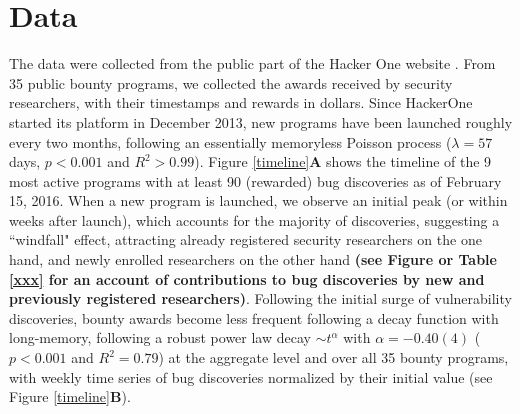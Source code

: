 \section{Data}
\label{sec:data}
The data were collected from the public part of the Hacker One website \cite{hackerOne}. From 35 public bounty programs, we collected the awards received by security researchers, with their timestamps and rewards in dollars. Since HackerOne started its platform in December 2013, new programs have been launched roughly every two months, following an essentially memoryless Poisson process ($\lambda = 57$ days, $p < 0.001$ and $R^2 > 0.99$). Figure \ref{timeline}{\bf A} shows the timeline of the 9 most active programs with at least 90 (rewarded) bug discoveries as of February 15, 2016. When a new program is launched, we observe an initial peak (or within weeks after launch), which accounts for the majority of discoveries, suggesting a ``windfall" effect, attracting already registered security researchers on the one hand, and newly enrolled researchers on the other hand {\bf (see Figure or Table \ref{xxx} for an account of contributions to bug discoveries by new and previously registered researchers)}. Following the initial surge of vulnerability discoveries, bounty awards become less frequent following a decay function with long-memory, following a robust power law decay $\sim t^{\alpha}$ with $\alpha = -0.40(4)$ ($p < 0.001$ and $R^2 = 0.79$) at the aggregate level and over all 35 bounty programs, with weekly time series of bug discoveries normalized by their initial value (see Figure \ref{timeline}{\bf B}).\\


